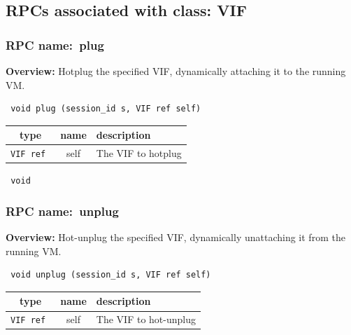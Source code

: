 \subsection{RPCs associated with class: VIF}
\subsubsection{RPC name:~plug}

{\bf Overview:} 
Hotplug the specified VIF, dynamically attaching it to the running VM.

\begin{verbatim} void plug (session_id s, VIF ref self)\end{verbatim}



 
\vspace{0.3cm}
\begin{tabular}{|c|c|p{7cm}|}
 \hline
{\bf type} & {\bf name} & {\bf description} \\ \hline
{\tt VIF ref } & self & The VIF to hotplug \\ \hline 

\end{tabular}

\vspace{0.3cm}

{\tt 
void
}



\vspace{0.3cm}
\vspace{0.3cm}
\vspace{0.3cm}
\subsubsection{RPC name:~unplug}

{\bf Overview:} 
Hot-unplug the specified VIF, dynamically unattaching it from the running
VM.

\begin{verbatim} void unplug (session_id s, VIF ref self)\end{verbatim}



 
\vspace{0.3cm}
\begin{tabular}{|c|c|p{7cm}|}
 \hline
{\bf type} & {\bf name} & {\bf description} \\ \hline
{\tt VIF ref } & self & The VIF to hot-unplug \\ \hline 

\end{tabular}

